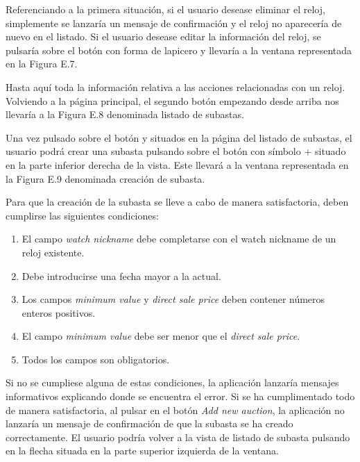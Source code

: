 	Referenciando a la primera situación, si el usuario desease eliminar el reloj, simplemente se lanzaría un mensaje de confirmación y el reloj no aparecería de nuevo en el listado. Si el usuario desease editar la información del reloj, se pulsaría sobre el botón con forma de lapicero y llevaría a la ventana representada en la Figura E.7.

	
	Hasta aquí toda la información relativa a las acciones relacionadas con un reloj. Volviendo a la página principal, el segundo botón empezando desde arriba nos llevaría a la Figura E.8 denominada listado de subastas.

	
	Una vez pulsado sobre el botón y situados en la página del listado de subastas, el usuario podrá crear una subasta pulsando sobre el botón con símbolo + situado en la parte inferior derecha de la vista. Este llevará a la ventana representada en la Figura E.9 denominada creación de subasta.


	Para que la creación de la subasta se lleve a cabo de manera satisfactoria, deben cumplirse las siguientes condiciones:
	\begin{enumerate}
		\item El campo \emph{watch nickname} debe completarse con el watch nickname de un reloj existente.
		\item Debe introducirse una fecha mayor a la actual.
		\item Los campos \emph{minimum value} y \emph{direct sale price} deben contener números enteros positivos.
		\item El campo \emph{minimum value} debe ser menor que el \emph{direct sale price}.
		\item Todos los campos son obligatorios.
	\end{enumerate}
	
	Si no se cumpliese alguna de estas condiciones, la aplicación lanzaría mensajes informativos explicando donde se encuentra el error. Si se ha cumplimentado todo de manera satisfactoria, al pulsar en el botón \emph{Add new auction}, la aplicación no lanzaría un mensaje de confirmación de que la subasta se ha creado correctamente. El usuario podría volver a la vista de listado de subasta pulsando en la flecha situada en la parte superior izquierda de la ventana.
	
